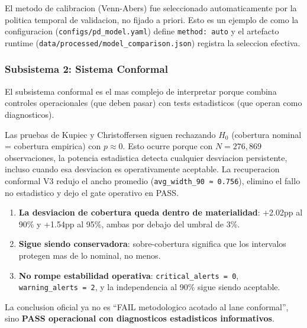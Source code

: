 \documentclass[
  spanish,
  11pt,
  letterpaper,
]{scrbook}
\providecommand{\tightlist}{%
  \setlength{\itemsep}{0pt}\setlength{\parskip}{0pt}}
\theoremstyle{plain}
\theoremstyle{remark}
\begin{document}
El metodo de calibracion (Venn-Abers) fue seleccionado automaticamente
por la politica temporal de validacion, no fijado a priori. Esto es un
ejemplo de como la configuracion (\texttt{configs/pd\_model.yaml})
define \texttt{method:\ auto} y el artefacto runtime
(\texttt{data/processed/model\_comparison.json}) registra la seleccion
efectiva.

\subsubsection{Subsistema 2: Sistema
Conformal}\label{sec-mrm-conformal-subsystem}

El subsistema conformal es el mas complejo de interpretar porque combina
controles operacionales (que deben pasar) con tests estadisticos (que
operan como diagnosticos).

\begin{tcolorbox}[enhanced jigsaw, arc=.35mm, bottomrule=.15mm, bottomtitle=1mm, breakable, colback=white, colbacktitle=quarto-callout-warning-color!10!white, colframe=quarto-callout-warning-color-frame, coltitle=black, left=2mm, leftrule=.75mm, opacityback=0, opacitybacktitle=0.6, rightrule=.15mm, title=\textcolor{quarto-callout-warning-color}{\faExclamationTriangle}\hspace{0.5em}{Por que el sistema conformal hoy pasa aunque los tests estadisticos
sigan rechazando}, titlerule=0mm, toprule=.15mm, toptitle=1mm]

Las pruebas de Kupiec y Christoffersen siguen rechazando \(H_0\)
(cobertura nominal = cobertura empirica) con \(p \approx 0\). Esto
ocurre porque con \(N = 276{,}869\) observaciones, la potencia
estadistica detecta cualquier desviacion persistente, incluso cuando esa
desviacion es operativamente aceptable. La recuperacion conformal V3
redujo el ancho promedio (\texttt{avg\_width\_90\ ≈\ 0.756}), elimino el
fallo no estadistico y dejo el gate operativo en PASS.

\begin{enumerate}
\def\labelenumi{\arabic{enumi}.}
\tightlist
\item
  \textbf{La desviacion de cobertura queda dentro de materialidad}:
  +2.02pp al 90\% y +1.54pp al 95\%, ambas por debajo del umbral de 3\%.
\item
  \textbf{Sigue siendo conservadora}: sobre-cobertura significa que los
  intervalos protegen mas de lo nominal, no menos.
\item
  \textbf{No rompe estabilidad operativa}:
  \texttt{critical\_alerts\ =\ 0}, \texttt{warning\_alerts\ =\ 2}, y la
  independencia al 90\% sigue siendo aceptable.
\end{enumerate}

La conclusion oficial ya no es ``FAIL metodologico acotado al lane
conformal'', sino \textbf{PASS operacional con diagnosticos estadisticos
informativos}.

\end{tcolorbox}
\end{document}
